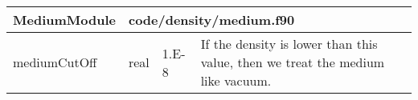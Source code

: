 \documentclass{article}
\begin{document}

\begin{longtable}{llll}
\toprule
\textbf{\large{MediumModule}} & \multicolumn{3}{l}{\footnotesize{code/density/medium.f90}}\\*
\midrule
\endfirsthead
\midrule
\endhead
mediumCutOff & \begin{minipage}[t]{2cm}real\end{minipage} & \begin{minipage}[t]{2cm}1.E-8\end{minipage} & \begin{minipage}[t]{12cm}If the density is lower than this value, then we treat the medium like vacuum.\end{minipage}\\*
\bottomrule
\end{longtable}
{ }



\end{document}
